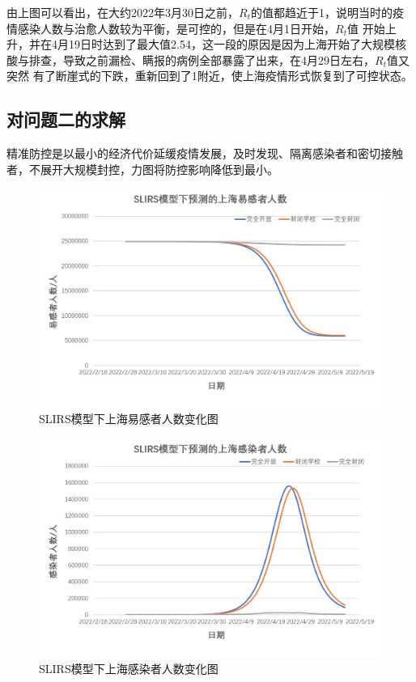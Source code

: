 \documentclass[bwprint]{gmcmthesis}
\numberwithin{figure}{section}
\begin{document}
\par 由上图可以看出，在大约2022年3月30日之前，$R_t$的值都趋近于1，说明当时的疫情感染人数与治愈人数较为平衡，是可控的，但是在4月1日开始，$R_t$值
开始上升，并在4月19日时达到了最大值2.54，这一段的原因是因为上海开始了大规模核酸与排查，导致之前漏检、瞒报的病例全部暴露了出来，在4月29日左右，$R_t$值又突然
有了断崖式的下跌，重新回到了1附近，使上海疫情形式恢复到了可控状态。


\subsection{对问题二的求解}
精准防控是以最小的经济代价延缓疫情发展，及时发现、隔离感染者和密切接触者，不展开大规模封控，力图将防控影响降低到最小。

\begin{figure}[!h]
  \centering
  \includegraphics[width=.9\textwidth]{SLIRS_S.png}
  \caption{SLIRS模型下上海易感者人数变化图}
  \label{fig1}
\end{figure}

\begin{figure}[!h]
  \centering
  \includegraphics[width=.9\textwidth]{SLIRS_I.png}
  \caption{SLIRS模型下上海感染者人数变化图}
  \label{fig1}
\end{figure}
\end{document}
